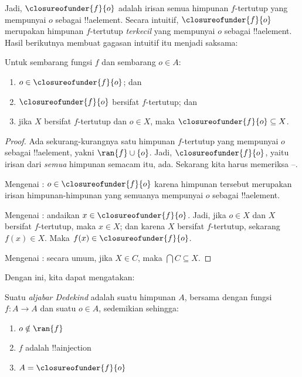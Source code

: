 \documentclass[../../../include/open-logic-section]{subfiles}
\begin{document}
Jadi, $\closureofunder{f}{o}$ adalah irisan semua himpunan $f$-tertutup
yang mempunyai $o$ sebagai !!a{element}. Secara intuitif,
$\closureofunder{f}{o}$ merupakan himpunan $f$-tertutup \emph{terkecil}
yang mempunyai $o$ sebagai !!a{element}. Hasil berikutnya membuat gagasan
intuitif itu menjadi saksama:
\begin{lem}
	Untuk sembarang fungsi $f$ dan sembarang $o \in A$:
	\begin{enumerate}
		\item{} $o \in \closureofunder{f}{o}$; dan
		\item{} $\closureofunder{f}{o}$ bersifat $f$-tertutup; dan
		\item{} jika $X$ bersifat $f$-tertutup dan $o \in
		X$, maka $\closureofunder{f}{o} \subseteq X$.
	\end{enumerate}
\end{lem}

\begin{proof}
Ada sekurang-kurangnya satu himpunan $f$-tertutup
yang mempunyai $o$ sebagai !!a{element}, yakni $\ran{f}\cup \{o\}$. Jadi,
$\closureofunder{f}{o}$, yaitu irisan dari \emph{semua} himpunan semacam itu,
ada. Sekarang kita harus memeriksa
--.

Mengenai : $o \in \closureofunder{f}{o}$ karena
himpunan tersebut merupakan irisan himpunan-himpunan yang semuanya mempunyai
$o$ sebagai !!a{element}.

Mengenai : andaikan $x \in \closureofunder{f}{o}$.
Jadi, jika $o \in X$ dan $X$ bersifat $f$-tertutup, maka $x \in X$; dan
karena $X$ bersifat $f$-tertutup, sekarang $f(x) \in X$. Maka
$f(x) \in \closureofunder{f}{o}$.

Mengenai : secara umum, jika $X
\in C$, maka $\bigcap C \subseteq X$.
\end{proof}

Dengan ini, kita dapat mengatakan:

\begin{defn}
Suatu \emph{aljabar Dedekind} adalah suatu himpunan $A$, bersama dengan
fungsi $f \colon A \to A$ dan suatu $o \in A$, sedemikian sehingga:
	\begin{enumerate}
		\item {} $o \notin \ran{f}$
		\item {} $f$ adalah !!a{injection}
		\item {} $A = \closureofunder{f}{o}$
	\end{enumerate}
\end{defn}
\end{document}
